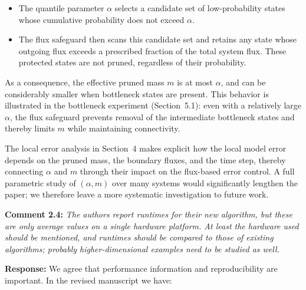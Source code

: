 \documentclass[11pt]{article}
\begin{document}
\begin{itemize}
  \item The quantile parameter $\alpha$ selects a candidate set of low-probability
        states whose cumulative probability does not exceed $\alpha$.
  \item The flux safeguard then scans this candidate set and retains any state
        whose outgoing flux exceeds a prescribed fraction of the total system
        flux. These protected states are not pruned, regardless of their
        probability.
\end{itemize}

As a consequence, the effective pruned mass $m$ is at most $\alpha$, and can
be considerably smaller when bottleneck states are present. This behavior is
illustrated in the bottleneck experiment (Section~5.1): even with a relatively
large $\alpha$, the flux safeguard prevents removal of the intermediate bottleneck
states and thereby limits $m$ while maintaining connectivity.

The local error analysis in Section~4 makes explicit how the local model error
depends on the pruned mass, the boundary fluxes, and the time step, thereby
connecting $\alpha$ and $m$ through their impact on the flux-based error control.
A full parametric study of $(\alpha,m)$ over many systems would significantly
lengthen the paper; we therefore leave a more systematic investigation to future
work.

\medskip

\noindent\textbf{Comment 2.4:} \textit{The authors report runtimes for their new algorithm, but these are
only average values on a single hardware platform. At least the hardware used
should be mentioned, and runtimes should be compared to those of existing
algorithms; probably higher-dimensional examples need to be studied as well.}

\textbf{Response:} We agree that performance information and reproducibility are
important. In the revised manuscript we have:
\end{document}
